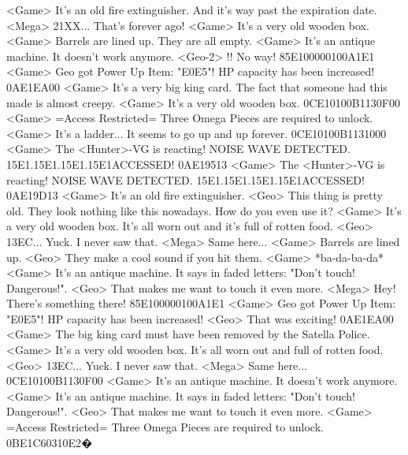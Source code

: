 <Game> It's an old fire extinguisher. And it's way past the expiration date. 
<Mega> 21XX... That's forever ago! 
<Game> It's a very old wooden box. 
<Game> Barrels are lined up. They are all empty. 
<Game> It's an antique machine. It doesn't work anymore. 
<Geo-2> !! No way! 
{85}{E1}{00}{00}{01}{00}{A1}{E1} 
<Game> Geo got Power Up Item: "{E0}{E5}"! 
HP capacity has been increased! 
{0A}{E1}{EA}{00}
<Game> It's a very big king card. 
The fact that someone had this made is almost creepy. 
<Game> It's a very old wooden box. 
{0C}{E1}{01}{00}{B1}{13}{0F}{00}
<Game> =Access Restricted= Three Omega Pieces are required to unlock. 
<Game> It's a ladder... 
It seems to go up and up forever. 
{0C}{E1}{01}{00}{B1}{13}{10}{00}
<Game> The <Hunter>-VG is reacting! 
NOISE WAVE DETECTED. {15}{E1}.{15}{E1}.{15}{E1}.{15}{E1}ACCESSED! 
{0A}{E1}{95}{13}
<Game> The <Hunter>-VG is reacting! 
NOISE WAVE DETECTED. {15}{E1}.{15}{E1}.{15}{E1}.{15}{E1}ACCESSED! 
{0A}{E1}{9D}{13}
<Game> It's an old fire extinguisher. 
<Geo> This thing is pretty old. 
They look nothing like this nowadays. How do you even use it? 
<Game> It's a very old wooden box. It's all worn out and it's full of rotten food. 
<Geo> {13}{EC}... 
Yuck. I never saw that. 
<Mega> Same here... 
<Game> Barrels are lined up. 
<Geo> They make a cool sound if you hit them. 
<Game> *ba-da-ba-da* 
<Game> It's an antique machine. 
It says in faded letters: "Don't touch! Dangerous!". 
<Geo> That makes me want to touch it even more. 
<Mega> Hey! There's something there! 
{85}{E1}{00}{00}{01}{00}{A1}{E1} 
<Game> Geo got Power Up Item: "{E0}{E5}"! 
HP capacity has been increased! 
<Geo> That was exciting! 
{0A}{E1}{EA}{00}
<Game> The big king card must have been removed by the Satella Police. 
<Game> It's a very old wooden box. It's all worn out and full of rotten food. 
<Geo> {13}{EC}... 
Yuck. I never saw that. 
<Mega> Same here... 
{0C}{E1}{01}{00}{B1}{13}{0F}{00}
<Game> It's an antique machine. It doesn't work anymore. 
<Game> It's an antique machine. 
It says in faded letters: "Don't touch! Dangerous!". 
<Geo> That makes me want to touch it even more. 
<Game> =Access Restricted= Three Omega Pieces are required to unlock. 
{0B}{E1}{C6}{03}{10}{E2}�
